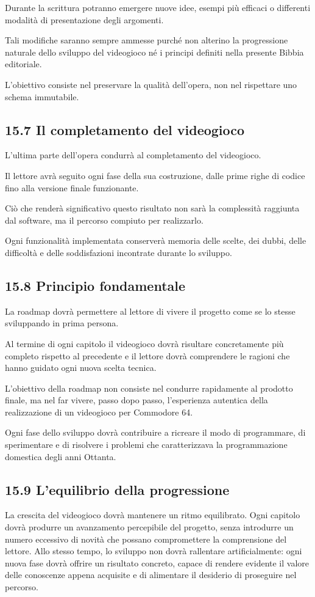 \documentclass{article}
\begin{document}
Durante la scrittura potranno emergere nuove idee, esempi più efficaci o differenti modalità di presentazione degli
argomenti.

Tali modifiche saranno sempre ammesse purché non alterino la progressione naturale dello sviluppo del videogioco né i
principi definiti nella presente Bibbia editoriale.

L'obiettivo consiste nel preservare la qualità dell'opera, non nel rispettare uno schema immutabile.

\subsection{15.7 Il completamento del videogioco}
L'ultima parte dell'opera condurrà al completamento del videogioco.

Il lettore avrà seguito ogni fase della sua costruzione, dalle prime righe di codice fino alla versione finale
funzionante.

Ciò che renderà significativo questo risultato non sarà la complessità raggiunta dal software, ma il percorso compiuto
per realizzarlo.

Ogni funzionalità implementata conserverà memoria delle scelte, dei dubbi, delle difficoltà e delle soddisfazioni
incontrate durante lo sviluppo.

\subsection{15.8 Principio fondamentale}
La roadmap dovrà permettere al lettore di vivere il progetto come se lo stesse sviluppando in prima persona.

Al termine di ogni capitolo il videogioco dovrà risultare concretamente più completo rispetto al precedente e il lettore
dovrà comprendere le ragioni che hanno guidato ogni nuova scelta tecnica.

L'obiettivo della roadmap non consiste nel condurre rapidamente al prodotto finale, ma nel far vivere, passo dopo passo,
l'esperienza autentica della realizzazione di un videogioco per Commodore 64.

Ogni fase dello sviluppo dovrà contribuire a ricreare il modo di programmare, di sperimentare e di risolvere i problemi
che caratterizzava la programmazione domestica degli anni Ottanta.

\subsection[15.9 L{}'equilibrio della progressione]{15.9 L'equilibrio della progressione}
La crescita del videogioco dovrà mantenere un ritmo equilibrato. Ogni capitolo dovrà produrre un avanzamento percepibile
del progetto, senza introdurre un numero eccessivo di novità che possano compromettere la comprensione del lettore.
Allo stesso tempo, lo sviluppo non dovrà rallentare artificialmente: ogni nuova fase dovrà offrire un risultato
concreto, capace di rendere evidente il valore delle conoscenze appena acquisite e di alimentare il desiderio di
proseguire nel percorso.
\end{document}
